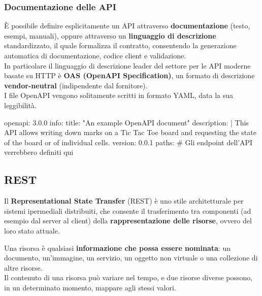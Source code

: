 \documentclass[12pt]{article}
\begin{document}
\subsubsection{Documentazione delle API}
È possibile definire esplicitamente un API attraverso \textbf{documentazione} (testo, esempi, manuali),
oppure attraverso un \textbf{linguaggio di descrizione} standardizzato, il quale formalizza il contratto, consentendo la generazione automatica di documentazione, codice client e validazione.\\
In particolare il linguaggio di descrizione leader del settore per le API moderne basate su HTTP è \textbf{OAS (OpenAPI Specification)}, un formato di descrizione \textbf{vendor-neutral} (indipendente dal fornitore).\\
I file OpenAPI vengono solitamente scritti in formato YAML, data la sua leggibilità.
\begin{code}[language=YAML]
  openapi: 3.0.0
  info:
    title: "An example OpenAPI document"
    description: |
      This API allows writing down marks on a Tic Tac Toe board
      and requesting the state of the board or of individual cells.
    version: 0.0.1
  paths: {} # Gli endpoint dell'API verrebbero definiti qui
\end{code}

\subsection{REST}
Il \textbf{Representational State Transfer} (REST) è uno stile architetturale per sistemi ipermediali distribuiti,
che consente il trasferimento tra componenti (ad esempio dal server al client) della \textbf{rappresentazione delle risorse}, ovvero del loro stato attuale.
\begin{definition}[Risorsa]
Una risorsa è qualsiasi \textbf{informazione che possa essere nominata}:
un documento, un'immagine, un servizio, un oggetto non virtuale o una collezione di altre risorse.\\
Il contenuto di una risorsa può variare nel tempo, e due risorse diverse possono, in un determinato momento, mappare agli stessi valori.
\end{definition}
\end{document}
